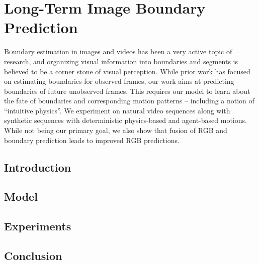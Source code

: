 \chapter[Long-Term Image Boundary Prediction]{Long-Term Image Boundary Prediction}
\label{chap:aaai18}
\minitoc\vspace{2ex}
\lettrine[lines=3]{B}{o}undary estimation in images and videos has been a very active topic of research, and organizing visual information into boundaries and segments is believed to be a corner stone of visual perception. While prior work has focused on estimating boundaries for observed frames, our work aims at predicting boundaries of future unobserved frames. This requires our model to learn about the fate of boundaries and corresponding motion patterns -- including a notion of ``intuitive physics''. We experiment on natural video sequences along with synthetic sequences with deterministic physics-based and agent-based motions. While not being our primary goal, we also show that fusion of RGB and boundary prediction leads to improved  RGB predictions.
\section{Introduction}
\label{sec:aaai18:intro}




\section{Model} 
\label{sec:aaai18:model}


\section{Experiments}
\label{sec:aaai18:experiments}


\section{Conclusion}
\label{sec:aaa18:conclusion}

